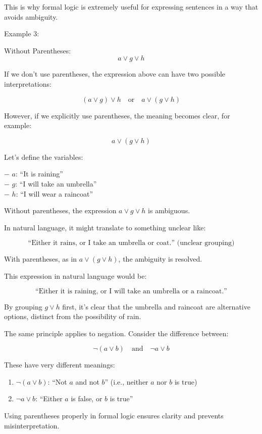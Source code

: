 This is why formal logic is extremely useful for expressing sentences in
a way that avoids ambiguity.

Example 3:

Without Parentheses:\\
\[a \lor g \lor h\]

If we don't use parentheses, the expression above can have two possible
interpretations:

\[(a \lor g) \lor h \quad \text{or} \quad a \lor (g \lor h)\]

However, if we explicitly use parentheses, the meaning becomes clear,
for example:

\[a \lor (g \lor h)\]

Let's define the variables:

− \(a\): ``It is raining''\\
− \(g\): ``I will take an umbrella''\\
− \(h\): ``I will wear a raincoat''

Without parentheses, the expression \(a \lor g \lor h\) is ambiguous.

In natural language, it might translate to something unclear like:

\[\text{“Either it rains, or I take an umbrella or coat.” (unclear grouping)}\]

With parentheses, as in \(a \lor (g \lor h)\), the ambiguity is
resolved.

This expression in natural language would be:

\[\text{“Either it is raining, or I will take an umbrella or a raincoat.”}\]

By grouping \(g \lor h\) first, it's clear that the umbrella and
raincoat are alternative options, distinct from the possibility of rain.

The same principle applies to negation. Consider the difference between:

\[\lnot (a \lor b) \quad \text{and} \quad \lnot a \lor b\]

These have very different meanings:

\begin{enumerate}
\def\labelenumi{\arabic{enumi}.}
\tightlist
\item
  \(\lnot (a \lor b)\): ``Not \(a\) and not \(b\)'' (i.e., neither \(a\)
  nor \(b\) is true)
\item
  \(\lnot a \lor b\): ``Either \(a\) is false, or \(b\) is true''
\end{enumerate}

Using parentheses properly in formal logic ensures clarity and prevents
misinterpretation.
